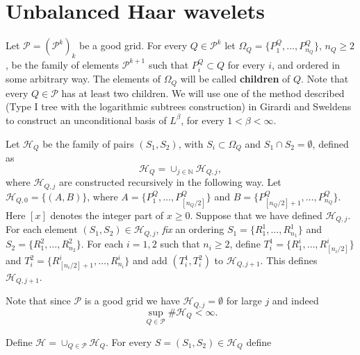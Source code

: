 \documentclass{amsart}
\theoremstyle{definition}
\begin{document}
\section{Unbalanced Haar wavelets} \label{haar} Let $\mathcal{P}=(\mathcal{P}^k)_k$ be a good grid. For every $Q \in \mathcal{P}^k$ let $\Omega_Q=\{ P_1^Q,\dots,P_{n_Q}^Q\}$, $n_Q\geq 2$,  be  the family of  elements  $\mathcal{P}^{k+1}$ such that $P_i^Q \subset Q$ for every $i$, and ordered in some arbitrary way.  The elements of  $\Omega_Q$ will be called   {\bf children} of $Q$.  Note that every $Q\in \mathcal{P}$ has at least two children. We will use one of the method described (Type I tree with the logarithmic subtrees construction) in  Girardi and Sweldens \cite{gw} to construct an unconditional basis of $L^{\beta}$, for every  $1< \beta <\infty$. 

Let   $\mathcal{H}_Q$ be the family of pairs $(S_1,S_2)$, with $S_i \subset \Omega_Q$ and $S_1\cap S_2=\emptyset$, defined  as
$$\mathcal{H}_Q=\cup_{j\in \mathbb{N}} \mathcal{H}_{Q,j},$$
where $\mathcal{H}_{Q,j}$ are constructed recursively  in the  following way. Let $\mathcal{H}_{Q,0}=\{ (A,B)\}$, where $A=\{ P_1^Q,\dots,P_{[n_Q/2]}^Q   \}$ and $B=\{ P_{[n_Q/2]+1}^Q,\dots,P_{n_Q}^Q   \}$. Here $[x]$ denotes the integer part of $x\geq 0$.   Suppose that we have defined  $\mathcal{H}_{Q,j}$. For each element   $(S_1,S_2)\in \mathcal{H}_{Q,j}$, {\it fix}  an ordering $S_1=\{ R_1^1, \dots, R_{n_1}^1  \}$ and $S_2=\{ R_1^2, \dots, R_{n_2}^2  \}$. For each  $i=1,2$ such that  $n_i\geq 2$, define $T_i^1=\{ R_1^i,\dots,R_{[n_i/2]}^i  \}$ and $T_i^2=\{ R_{[n_i/2]+1}^i,\dots,R_{n_i}^i   \}$ and  add  $(T_i^1,T_i^2)$ to  $\mathcal{H}_{Q,j+1}$. This defines $\mathcal{H}_{Q,j+1}.$

Note that since $\mathcal{P}$ is a good grid we have $\mathcal{H}_{Q,j}=\emptyset$ for large $j$ and indeed 
$$\sup_{Q\in \mathcal{P}} \#\mathcal{H}_Q < \infty.$$

Define $\mathcal{H}=\cup_{Q\in \mathcal{P}} \mathcal{H}_Q$.  For every $S=(S_1,S_2) \in\mathcal{H}_Q$ define
\end{document}
